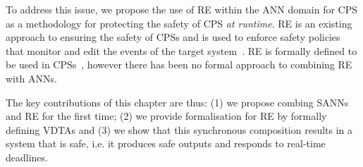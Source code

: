 To address this issue, we propose the use of \ac{RE} within the \ac{ANN} domain for \ac{CPS} as a methodology for protecting the safety of \ac{CPS} \textit{at runtime}.
\ac{RE} is an existing approach to ensuring the safety of \acp{CPS} and is used to enforce safety policies that monitor and edit the events of the target system~\cite{rta-cps}.
\ac{RE} is formally defined to be used in \acp{CPS}~\cite{recps}, however there has been no formal approach to combining \ac{RE} with \acp{ANN}. 

The key contributions of this chapter are thus: (1) we propose combing \acp{SANN} and \ac{RE} for the first time; (2) we provide formalisation for \ac{RE} by formally defining \acfp{VDTA} and (3) we show that this synchronous composition results in a system that is safe, i.e. it produces safe outputs and responds to real-time deadlines. 

